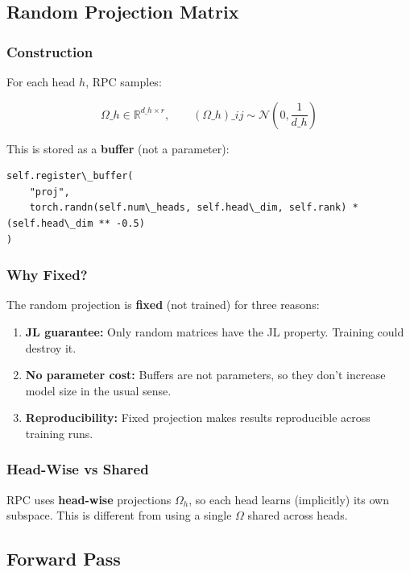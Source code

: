 \subsection{Random Projection Matrix}

\subsubsection{Construction}

For each head $h$, RPC samples:

\[
\Omega\_h \in \mathbb{R}^{d\_h \times r}, \qquad
(\Omega\_h)\_{ij} \sim \mathcal{N}\!\left(0, \frac{1}{d\_h}\right)
\tag{4.1}
\]

This is stored as a \textbf{buffer} (not a parameter):

\begin{lstlisting}
self.register\_buffer(
    "proj",
    torch.randn(self.num\_heads, self.head\_dim, self.rank) * (self.head\_dim ** -0.5)
)
\end{lstlisting}

\subsubsection{Why Fixed?}

The random projection is \textbf{fixed} (not trained) for three reasons:

\begin{enumerate}
\item \textbf{JL guarantee:} Only random matrices have the JL property. Training
  could destroy it.
\item \textbf{No parameter cost:} Buffers are not parameters, so they don't increase
  model size in the usual sense.
\item \textbf{Reproducibility:} Fixed projection makes results reproducible across
  training runs.

\end{enumerate}
\subsubsection{Head-Wise vs Shared}

RPC uses \textbf{head-wise} projections $\Omega_h$, so each head learns (implicitly) 
its own subspace. This is different from using a single $\Omega$ shared 
across heads.

\subsection{Forward Pass}

